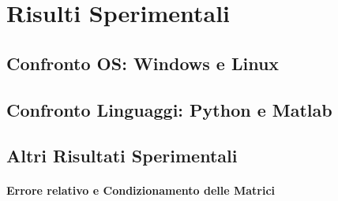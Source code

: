 \section{Risulti Sperimentali}
\subsection{Confronto OS: Windows e Linux}
\subsection{Confronto Linguaggi: Python e Matlab}
\subsection{Altri Risultati Sperimentali}
\paragraph{Errore relativo e Condizionamento delle Matrici}
\paragraph{}